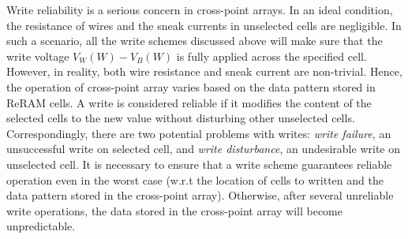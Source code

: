 Write reliability is a serious concern in cross-point arrays. In an ideal
condition, the resistance of wires and the sneak currents in unselected
cells are negligible. In such a scenario, all the write schemes discussed
above will make sure that the write voltage $V_W(W)-V_B(W)$ is fully
applied across the specified cell. However, in reality, both wire
resistance and sneak current are non-trivial. Hence, the operation of
cross-point array varies based on the data pattern stored in ReRAM
cells. A write is considered reliable if it modifies the content of the
selected cells to the new value without disturbing other unselected cells.
Correspondingly, there are two potential problems with writes: \emph{write failure}, an
unsuccessful write on selected cell, and \emph{write disturbance}, an
undesirable write on unselected cell. It is necessary to ensure that a
write scheme guarantees reliable operation even in the worst case (w.r.t
the location of cells to written and the data pattern stored in the
cross-point array). Otherwise, after several unreliable write operations,
the data stored in the cross-point array will become unpredictable.

